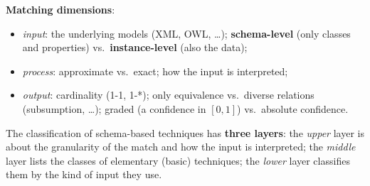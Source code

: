 \textbf{Matching dimensions}:
\begin{itemize}[nosep]
  \item \emph{input}: the underlying models (XML, OWL, \ldots); \textbf{schema-level}
        (only classes and properties) vs.\ \textbf{instance-level} (also the data);
  \item \emph{process}: approximate vs.\ exact; how the input is interpreted;
  \item \emph{output}: cardinality (1-1, 1-*); only equivalence vs.\ diverse relations
        (subsumption, \ldots); graded (a confidence in $[0,1]$) vs.\ absolute confidence.
\end{itemize}

The classification of schema-based techniques has \textbf{three layers}: the
\emph{upper} layer is about the granularity of the match and how the input is
interpreted; the \emph{middle} layer lists the classes of elementary (basic) techniques;
the \emph{lower} layer classifies them by the kind of input they use.

